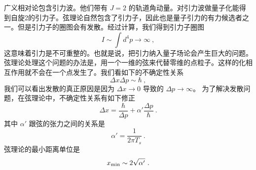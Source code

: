  
\begin{issues}
\issueNeedCite
\issueMissDepend
\end{issues}
 
 广义相对论包含引力波。他们带有 $J = 2$ 的轨道角动量。对引力波做量子化能得到自旋2的引力子。弦理论自然包含了引力子，因此也是量子引力的有力候选者之一。但是引力子的圈图会有发散。经过计算，我们得到引力子圈图
\begin{equation}
I \sim \int d^4 p \rightarrow \infty ~,
\end{equation}
这意味着引力是不可重整的。也就是说，把引力纳入量子场论会产生巨大的问题。弦理论处理这个问题的办法是，用一个一维的弦来代替零维的点粒子。这样的化相互作用就不会在一个点发生了。我们看如下的不确定性关系
\begin{equation}
\Delta x \Delta p \sim \hbar  ~,
\end{equation}
我们可以看出发散的真正原因是因为 $\Delta x \rightarrow 0$ 导致的 $\Delta p \rightarrow  \infty  $。  为了解决发散问题，在弦理论中，不确定性关系有如下修正
\begin{equation}
\Delta x  = \frac{\hbar}{\Delta p} + \alpha' \frac{\Delta p}{\hbar }~.
\end{equation}
其中 $\alpha'$ 跟弦的张力之间的关系是
\begin{equation}
\alpha ' = \frac{1}{2 \pi T_s} ~.
\end{equation}
弦理论的最小距离单位是
\begin{equation}
x_{\rm min} \sim 2 \sqrt{\alpha'}~.
\end{equation}

